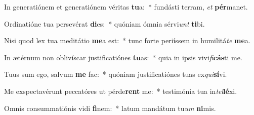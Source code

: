 \item In generatiónem et generatiónem véritas \textbf{tu}a:~* fundásti terram, \textit{et} \textbf{pér}manet.
\item Ordinatióne tua persevérat \textbf{di}es:~* quóniam ómnia sérvi\textit{unt} \textbf{ti}bi.
\item Nisi quod lex tua meditátio \textbf{me}a est:~* tunc forte periíssem in humilitá\textit{te} \textbf{me}a.
\item In ætérnum non oblivíscar justificatiónes \textbf{tu}as:~* quia in ipsis vivi\textit{fi}\textbf{cás}ti me.
\item Tuus sum ego, salvum \textbf{me} fac:~* quóniam justificatiónes tuas ex\textit{qui}\textbf{sí}vi.
\item Me exspectavérunt peccatóres ut pérde\textbf{rent} me:~* testimónia tua in\textit{tel}\textbf{lé}xi.
\item Omnis consummatiónis vidi \textbf{fi}nem:~* latum mandátum tu\textit{um} \textbf{ni}mis.

